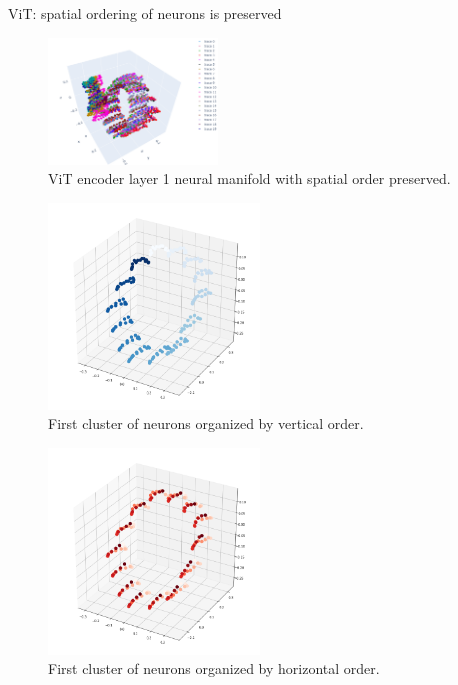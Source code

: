 \documentclass[xcolor={dvipsnames,svgnames}]{beamer}
\begin{document}
\begin{frame}{ViT: spatial ordering of neurons is preserved}
\begin{figure}
            \includegraphics[width=0.4\textwidth]{figures/embeddings/vit-3d-layer1.png}
            \caption{ViT encoder layer 1 neural manifold with spatial order preserved.}
        \end{figure} 
    \begin{minipage}[t]{.45\linewidth}  
    \begin{figure}
            \includegraphics[width=0.5\textwidth]{figures/embeddings/vit-spatial1.png}
            \caption{First cluster of neurons organized by vertical order.}
        \end{figure} 
    \end{minipage}
      \begin{minipage}[t]{.45\linewidth}   
      \begin{figure}         \includegraphics[width=0.5\textwidth]{figures/embeddings/vit-spatial2.png}
      \caption{First cluster of neurons organized by horizontal order.}
            \end{figure} 
    \end{minipage}
\end{frame}
\end{document}
